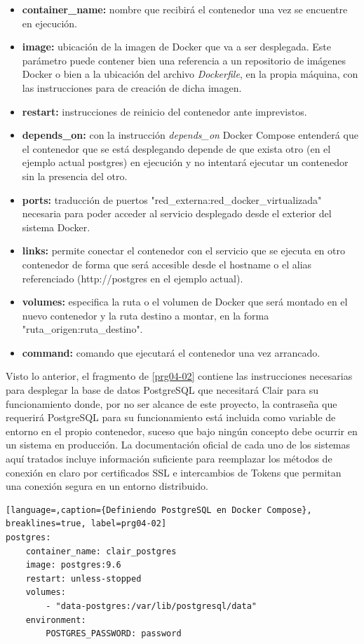 \begin{itemize}
	\item \textbf{container\_name:} nombre que recibirá el contenedor una vez se encuentre en ejecución.
	\item \textbf{image:} ubicación de la imagen de Docker que va a ser desplegada. Este parámetro puede contener bien una referencia a un repositorio de imágenes Docker o bien a la ubicación del archivo \textit{Dockerfile}, en la propia máquina, con las instrucciones para de creación de dicha imagen.
	\item \textbf{restart:} instrucciones de reinicio del contenedor ante imprevistos.
	\item \textbf{depends\_on:} con la instrucción \textit{depends\_on} Docker Compose entenderá que el contenedor que se está desplegando depende de que exista otro (en el ejemplo actual postgres) en ejecución y no intentará ejecutar un contenedor sin la presencia del otro.
	\item \textbf{ports:} traducción de puertos "red\_externa:red\_docker\_virtualizada" necesaria para poder acceder al servicio desplegado desde el exterior del sistema Docker.
	\item \textbf{links:} permite conectar el contenedor con el servicio que se ejecuta en otro contenedor de forma que será accesible desde el hostname o el alias referenciado (http://postgres en el ejemplo actual).
	\item \textbf{volumes:} especifica la ruta o el volumen de Docker que será montado en el nuevo contenedor y la ruta destino a montar, en la forma "ruta\_origen:ruta\_destino".
	\item \textbf{command:} comando que ejecutará el contenedor una vez arrancado.
\end{itemize}

Visto lo anterior, el fragmento de \autoref{prg04-02} contiene las instrucciones necesarias para desplegar la base de datos PostgreSQL que necesitará Clair para su funcionamiento donde, por no ser alcance de este proyecto, la contraseña que requerirá PostgreSQL para su funcionamiento está incluida como variable de entorno en el propio contenedor, suceso que bajo ningún concepto debe ocurrir en un sistema en producción. La documentación oficial de cada uno de los sistemas aquí tratados incluye información suficiente para reemplazar los métodos de conexión en claro por certificados SSL e intercambios de Tokens que permitan una conexión segura en un entorno distribuido.

\begin{lstlisting}[language=,caption={Definiendo PostgreSQL en Docker Compose}, breaklines=true, label=prg04-02]
postgres:
	container_name: clair_postgres
	image: postgres:9.6
	restart: unless-stopped
	volumes:
		- "data-postgres:/var/lib/postgresql/data"
	environment:
		POSTGRES_PASSWORD: password
\end{lstlisting}


